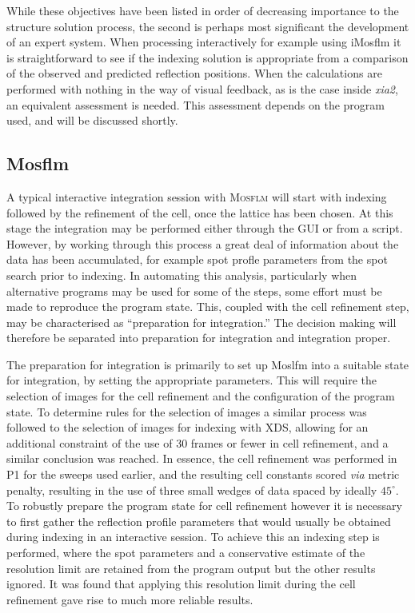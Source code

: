 \documentclass[preprint,pdf]{iucr}
\begin{document}
\noindent
While these objectives have been listed in order of decreasing
importance to the structure solution process, the second is perhaps
most significant the development of an expert system. When processing
interactively for example using iMosflm it is
straightforward to see if the indexing solution is appropriate from a
comparison of the observed and predicted reflection positions. When
the calculations are
performed with nothing in the way of visual feedback,
as is the case inside \emph{xia2}, an equivalent assessment is
needed. This assessment depends on the program used, and will be
discussed shortly.

\subsection{Mosflm}

A typical interactive integration session with \textsc{Mosflm} will start with
indexing followed by the refinement of the cell, once the lattice has
been chosen. At this stage the integration may be performed either
through the GUI or from a script. However, by working through this
process a great deal of information about the data has been
accumulated, for example spot profle parameters from the spot search
prior to indexing. In automating this analysis, particularly when
alternative programs may be used for some of the steps, some effort
must be made to reproduce the program state. This, coupled with the
cell refinement step, may be characterised as ``preparation for
integration.'' The decision making will therefore be separated into
preparation for integration and integration proper.

The preparation for integration is primarily to set up Moslfm into
a suitable state for integration, by setting the appropriate
parameters. This will require the
selection of images for the cell refinement and
the configuration of the program state. To determine rules for the
selection of images a similar process was followed to the selection of
images for indexing with XDS, allowing for an additional constraint of
the use of 30 frames or fewer in cell refinement, and a similar
conclusion was reached. 
In essence, the cell refinement was performed in P1 for the
sweeps used earlier, and the resulting cell constants scored
\emph{via} metric penalty, resulting in the use of three small wedges
of data spaced by ideally $45^{\circ}$. To robustly prepare the program state
for cell refinement however it is necessary to first gather the
reflection profile parameters that would usually be obtained during
indexing in an interactive session. To achieve this an indexing step is
performed, where the spot parameters and a conservative
estimate of the resolution limit are retained from the program output
but the other results ignored. It was found that
applying this resolution limit during the cell refinement gave rise to
much more reliable results.
\end{document}
